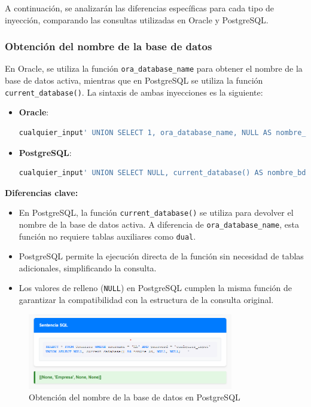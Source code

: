 \documentclass[a4paper,12pt]{article}
\begin{document}
A continuación, se analizarán las diferencias específicas para cada tipo de inyección, comparando las consultas utilizadas en Oracle y PostgreSQL.

\subsubsection{Obtención del nombre de la base de datos}
En Oracle, se utiliza la función \texttt{ora\_database\_name} para obtener el nombre de la base de datos activa, mientras que en PostgreSQL se utiliza la función \texttt{current\_database()}. La sintaxis de ambas inyecciones es la siguiente:

\begin{itemize}
    \item \textbf{Oracle}:
    \begin{lstlisting}[language=SQL]
    cualquier_input' UNION SELECT 1, ora_database_name, NULL AS nombre_bd_relleno_1, NULL AS nombre_bd_relleno_2 FROM dual --
    \end{lstlisting}

    \item \textbf{PostgreSQL}:
    \begin{lstlisting}[language=SQL]
    cualquier_input' UNION SELECT NULL, current_database() AS nombre_bd, NULL, NULL; --
    \end{lstlisting}
\end{itemize}

\textbf{Diferencias clave:}
\begin{itemize}
    \item En PostgreSQL, la función \texttt{current\_database()} se utiliza para devolver el nombre de la base de datos activa. A diferencia de \texttt{ora\_database\_name}, esta función no requiere tablas auxiliares como \texttt{dual}.
    \item PostgreSQL permite la ejecución directa de la función sin necesidad de tablas adicionales, simplificando la consulta.
    \item Los valores de relleno (\texttt{NULL}) en PostgreSQL cumplen la misma función de garantizar la compatibilidad con la estructura de la consulta original.
\end{itemize}

\begin{figure}[H]
    \centering
    \includegraphics[width=0.8\textwidth]{Imagenes/union7.png}
    \caption{Obtención del nombre de la base de datos en PostgreSQL}
\end{figure}
\end{document}
